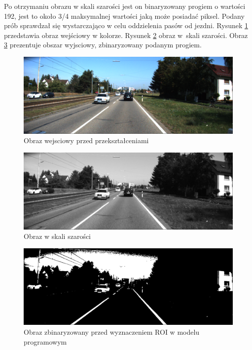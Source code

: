 Po otrzymaniu obrazu w skali szarości jest on binaryzowany progiem o wartości 192, jest to około 3/4 maksymalnej wartości jaką może posiadać piksel.
Podany prób sprawdzał się wystarczająco w celu oddzielenia pasów od jezdni. 
Rysunek \ref{fig:im_color} przedstawia obraz wejściowy w kolorze. Rysunek \ref{fig:im_grey} obraz w~skali szarości. Obraz \ref{fig:in_ROI} prezentuje obszar wyjsciowy, zbinaryzowany podanym progiem.

\begin{figure}[h]
	\centering
	\includegraphics[scale=0.3]{obraz_color.png}
	\caption{Obraz wejsciowy przed przekształceniami}
	\label{fig:im_color}
\end{figure}
\begin{figure}[h]
	\centering
	\includegraphics[scale=0.3]{obraz_grey.png}
	\caption{Obraz w skali szarości}
	\label{fig:im_grey}
\end{figure}
\begin{figure}[h]
	\centering
	\includegraphics[scale=0.3]{obraz_binarny.png}
	\caption{Obraz zbinaryzowany przed wyznaczeniem ROI w modelu programowym}
	\label{fig:in_ROI}
\end{figure}
